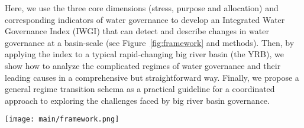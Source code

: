 Here, we use the three core dimensions (stress, purpose and allocation) and corresponding indicators of water governance to develop an Integrated Water Governance Index (IWGI) that can detect and describe changes in water governance at a basin-scale (see Figure~\ref{fig:framework} and methods).
Then, by applying the index to a typical rapid-changing big river basin (the YRB), we show how to analyze the complicated regimes of water governance and their leading causes in a comprehensive but straightforward way.
Finally, we propose a general regime transition schema as a practical guideline for a coordinated approach to exploring the challenges faced by big river basin governance.

\begin{figure*}%
	\centering
	\texttt{[image: main/framework.png]}
	\caption{
		A framework for identifying the water governance regimes and transitions of a hydrosocial cycle.
		\textbf{A:} water governance has three key dimensions (stress, purpose and allocation), each of which has two potential directions (denoted in red) when changing. (1) ``stress'' of water shifts between scarcity and abundance; (2) weighting ``purpose'' of water between consumptive services or non-consumptive uses; (3) ``allocation'' changes between balanced or lopsided.
		\textbf{B:} along with a transition of hydrosocial water cycle, water governance shifts in line with the three dimensions. Combining corresponding indicators, an abrupt change of the IWGI thus indicates a regime shift in water governance.
	}
	\label{fig:framework}
\end{figure*}

